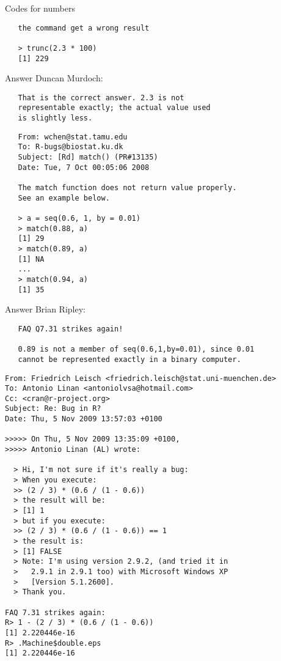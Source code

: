 \documentclass[11pt,compress,t,notes=noshow, xcolor=table]{beamer}
\begin{document}
\begin{vbframe}{Codes for numbers}
\begin{verbatim}
   the command get a wrong result

   > trunc(2.3 * 100)
   [1] 229
\end{verbatim}

Answer Duncan Murdoch:
\begin{verbatim}
   That is the correct answer. 2.3 is not
   representable exactly; the actual value used
   is slightly less.
\end{verbatim}

\framebreak

\small
\begin{verbatim}
   From: wchen@stat.tamu.edu
   To: R-bugs@biostat.ku.dk
   Subject: [Rd] match() (PR#13135)
   Date: Tue, 7 Oct 00:05:06 2008

   The match function does not return value properly.
   See an example below.

   > a = seq(0.6, 1, by = 0.01)
   > match(0.88, a)
   [1] 29
   > match(0.89, a)
   [1] NA
   ...
   > match(0.94, a)
   [1] 35
\end{verbatim}

\framebreak 

Answer Brian Ripley:
\begin{verbatim}
   FAQ Q7.31 strikes again!

   0.89 is not a member of seq(0.6,1,by=0.01), since 0.01
   cannot be represented exactly in a binary computer.
\end{verbatim}


\framebreak

\small
\begin{verbatim}
From: Friedrich Leisch <friedrich.leisch@stat.uni-muenchen.de>
To: Antonio Linan <antoniolvsa@hotmail.com>
Cc: <cran@r-project.org>
Subject: Re: Bug in R?
Date: Thu, 5 Nov 2009 13:57:03 +0100

>>>>> On Thu, 5 Nov 2009 13:35:09 +0100,
>>>>> Antonio Linan (AL) wrote:

  > Hi, I'm not sure if it's really a bug:
  > When you execute:
  >> (2 / 3) * (0.6 / (1 - 0.6))
  > the result will be:
  > [1] 1
  > but if you execute:
  >> (2 / 3) * (0.6 / (1 - 0.6)) == 1
  > the result is:
  > [1] FALSE
  > Note: I'm using version 2.9.2, (and tried it in
  >   2.9.1 in 2.9.1 too) with Microsoft Windows XP
  >   [Version 5.1.2600].
  > Thank you.

FAQ 7.31 strikes again:
R> 1 - (2 / 3) * (0.6 / (1 - 0.6))
[1] 2.220446e-16
R> .Machine$double.eps
[1] 2.220446e-16
\end{verbatim}


\end{vbframe}
\end{document}
